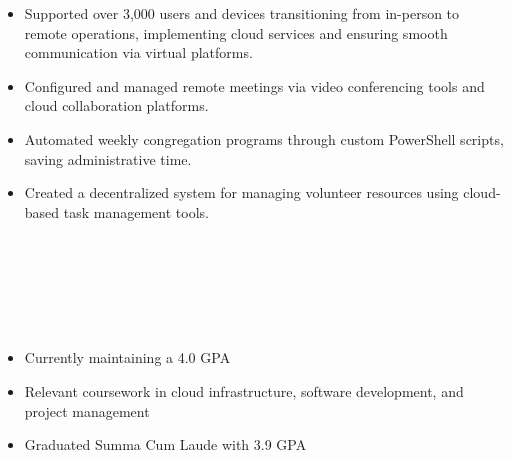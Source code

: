 \par\smallskip
\begin{minipage}{13.75cm}
  \begin{minipage}{6.5cm}
    \begin{itemize}
      \item Supported over 3,000 users and devices transitioning from in-person to remote operations, implementing cloud services and ensuring smooth communication via virtual platforms.
      \item Configured and managed remote meetings via video conferencing tools and cloud collaboration platforms.
    \end{itemize}
  \end{minipage}
  \hfill
  \begin{minipage}{6.5cm}
    \begin{itemize}
      \item Automated weekly congregation programs through custom PowerShell scripts, saving administrative time.
      \item Created a decentralized system for managing volunteer resources using cloud-based task management tools.
    \end{itemize}
  \end{minipage}
\end{minipage}

\par\bigskip
{}
\hfill{}\\
\hfill{}\\
\hfill{}\\
\hfill{}\\
\hfill{}\\

\par\bigskip
{}
\begin{itemize}
  \item Currently maintaining a 4.0 GPA
  \item Relevant coursework in cloud infrastructure, software development, and project management
\end{itemize}
\divider

\begin{itemize}
  \item Graduated Summa Cum Laude with 3.9 GPA
\end{itemize}


